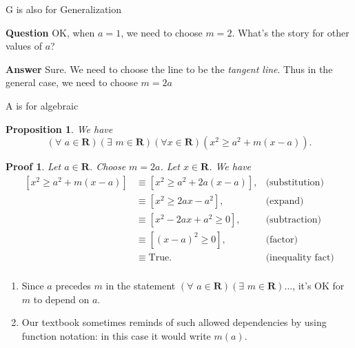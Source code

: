 \documentclass[usenames,dvipsnames,fleqn,leqno,10pt, pdflatex]{beamer}
\newcommand{\reals}{\mathbf{R}}
\newenvironment{PenList}{
  \begin{enumerate}[\textcolor{UNK-blue}{\PencilRightDown}]
    \addtolength{\itemsep}{-0.0\itemsep}}
  {\end{enumerate}}
\newtheorem{myprop}{Proposition}
\newtheorem{myproof}{Proof}
\begin{document}
\begin{frame}{G is also for Generalization}

\textbf{Question} OK, when $a=1$, we need to choose $m=2$. What's the story for other values of $a$?

\textbf{Answer} Sure.  We need to choose the line to be the \emph{tangent line}. Thus in the general case, we need to choose $m = 2 a$

\vfill

\end{frame}
\begin{frame}{A is for algebraic}

\begin{myprop}We have
$$
\left(\forall \,\, a \in \reals\right)\left(\exists \,\, m \in \reals\right)\left (\forall x \in \reals \right) \left(x^2 \geq a^2 + m (x-a) \right).
$$
\end{myprop}

\begin{myproof} Let $a \in \reals$. Choose $m = 2 a$. Let $x \in \reals$. We have
\begin{align*}
    \left[x^2 \geq a^2 + m (x -a) \right] &\equiv \left[x^2 \geq a^2 + 2a  (x -a) \right],
       &\mbox{(substitution)}\\
       &\equiv \left[x^2 \geq 2 a x - a^2\right], &\mbox{(expand)}\\
        &\equiv \left[x^2 - 2 a x + a^2  \geq 0 \right], &\mbox{(subtraction)}\\
        &\equiv \left[(x-a)^2  \geq 0 \right ], &\mbox{(factor)}\\    
        &\equiv \mbox{True}.   &\mbox{(inequality fact)}\\
\end{align*}
\end{myproof}

\begin{PenList}
\item  Since $a$ precedes $m$ in the statement $\left(\forall \,\, a \in \reals\right)\left(\exists \,\, m \in \reals\right) \dots$, it's OK for
$m$ to depend on $a$.

\item Our textbook sometimes reminds of such allowed dependencies by using function notation: in this case it would write $m(a)$.

\end{PenList}
\end{frame}
\end{document}
